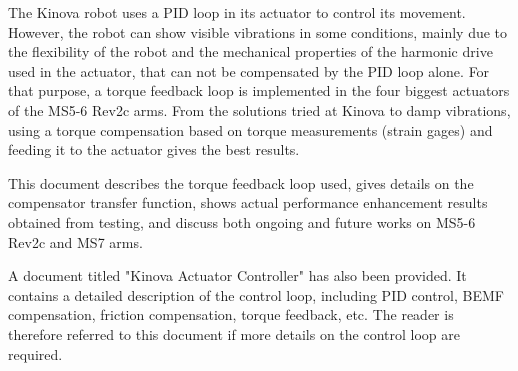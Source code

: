 The Kinova robot uses a PID loop in its actuator to control its movement. However, the robot can show visible vibrations in some conditions, mainly due to the flexibility of the robot and the mechanical properties of the harmonic drive used in the actuator, that can not be compensated by the PID loop alone. For that purpose, a torque feedback loop is implemented in the four biggest actuators of the MS5-6 Rev2c arms. From the solutions tried at Kinova to damp vibrations, using a torque compensation based on torque measurements (strain gages) and feeding it to the actuator gives the best results.

This document describes the torque feedback loop used, gives details on the compensator transfer function, shows actual performance enhancement results obtained from testing, and discuss both ongoing and future works on MS5-6 Rev2c and MS7 arms.


A document titled "Kinova Actuator Controller" has also been provided. It contains a detailed description of the control loop, including PID control, BEMF compensation, friction compensation, torque feedback, etc. The reader is therefore referred to this document if more details on the control loop are required.



